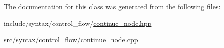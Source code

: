 The documentation for this class was generated from the following files\+:\begin{DoxyCompactItemize}
\item 
include/syntax/control\+\_\+flow/\hyperlink{continue__node_8hpp}{continue\+\_\+node.\+hpp}\item 
src/syntax/control\+\_\+flow/\hyperlink{continue__node_8cpp}{continue\+\_\+node.\+cpp}\end{DoxyCompactItemize}
